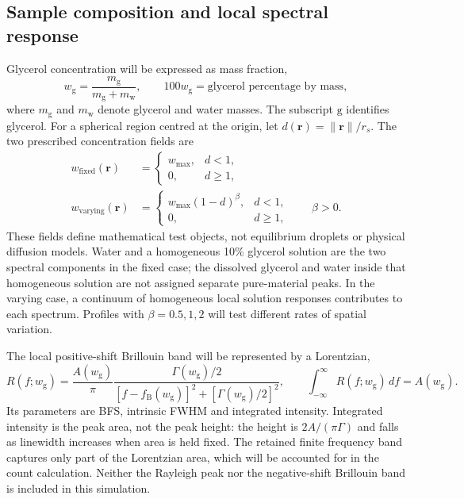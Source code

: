 \documentclass[11pt]{article}
\newcommand{\wg}{w_{\mathrm g}}
\newcommand{\wmax}{w_{\max}}
\begin{document}
\subsection{Sample composition and local spectral response}

Glycerol concentration will be expressed as mass fraction,
\begin{equation}
 \wg=\frac{m_{\mathrm g}}{m_{\mathrm g}+m_{\mathrm w}},\qquad 100\wg=\text{glycerol percentage by mass},
 \label{eq:glycerol_fraction}
\end{equation}
where $m_{\mathrm g}$ and $m_{\mathrm w}$ denote glycerol and water masses. The subscript $\mathrm g$ identifies glycerol. For a spherical region centred at the origin, let $d(\mathbf r)=\|\mathbf r\|/r_s$. The two prescribed concentration fields are
\begin{align}
 w_{\mathrm{fixed}}(\mathbf r)&=
 \begin{cases}\wmax,&d<1,\\0,&d\geq1,\end{cases} \\
 w_{\mathrm{varying}}(\mathbf r)&=
 \begin{cases}\wmax(1-d)^\beta,&d<1,\\0,&d\geq1,\end{cases}
 \qquad \beta>0.
 \label{eq:concentration_profile}
\end{align}
These fields define mathematical test objects, not equilibrium droplets or physical diffusion models. Water and a homogeneous 10\% glycerol solution are the two spectral components in the fixed case; the dissolved glycerol and water inside that homogeneous solution are not assigned separate pure-material peaks. In the varying case, a continuum of homogeneous local solution responses contributes to each spectrum. Profiles with $\beta=0.5,1,2$ will test different rates of spatial variation.

The local positive-shift Brillouin band will be represented by a Lorentzian,
\begin{equation}
 R(f;\wg)=\frac{A(\wg)}{\pi}
 \frac{\Gamma(\wg)/2}{[f-f_{\mathrm B}(\wg)]^2+[\Gamma(\wg)/2]^2},
 \qquad \int_{-\infty}^{\infty}R(f;\wg)\,df=A(\wg).
 \label{eq:component_spectrum}
\end{equation}
Its parameters are BFS, intrinsic FWHM and integrated intensity. Integrated intensity is the peak area, not the peak height: the height is $2A/(\pi\Gamma)$ and falls as linewidth increases when area is held fixed. The retained finite frequency band captures only part of the Lorentzian area, which will be accounted for in the count calculation. Neither the Rayleigh peak nor the negative-shift Brillouin band is included in this simulation.
\end{document}
